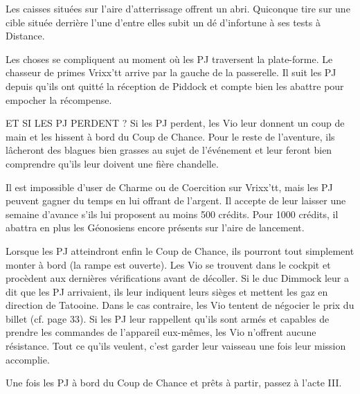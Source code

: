 \documentclass[a4paper,10pt,twoside,twocolumn,openany]{book}
\begin{document}
Les caisses situées sur l’aire d’atterrissage offrent un
abri. Quiconque tire sur une cible située derrière l’une
d’entre elles subit un dé d’infortune \boost à ses tests à
Distance.

Les choses se compliquent au moment où les PJ traversent la plate-forme. Le chasseur de primes Vrixx’tt
arrive par la gauche de la passerelle. Il suit les PJ depuis
qu’ils ont quitté la réception de Piddock et compte bien
les abattre pour empocher la récompense.

\begin{commentbox}{ET SI LES PJ PERDENT ?}
  Si les PJ perdent, les Vio leur donnent un coup de
main et les hissent à bord du Coup de Chance. Pour
le reste de l’aventure, ils lâcheront des blagues bien
grasses au sujet de l’événement et leur feront bien
comprendre qu’ils leur doivent une fière chandelle.
\end{commentbox}

Il est impossible d’user de Charme ou de Coercition
sur Vrixx’tt, mais les PJ peuvent gagner du temps en lui
offrant de l’argent. Il accepte de leur laisser une semaine
d’avance s’ils lui proposent au moins 500 crédits. Pour
1000 crédits, il abattra en plus les Géonosiens encore
présents sur l’aire de lancement.

Lorsque les PJ atteindront enfin le Coup de Chance,
ils pourront tout simplement monter à bord (la rampe
est ouverte). Les Vio se trouvent dans le cockpit et procèdent aux dernières vérifications avant de décoller. Si
le duc Dimmock leur a dit que les PJ arrivaient, ils leur
indiquent leurs sièges et mettent les gaz en direction de
Tatooine. Dans le cas contraire, les Vio tentent de négocier le prix du billet (cf. page 33). Si les PJ leur rappellent
qu’ils sont armés et capables de prendre les commandes
de l’appareil eux-mêmes, les Vio n’offrent aucune résistance. Tout ce qu’ils veulent, c’est garder leur vaisseau
une fois leur mission accomplie.

Une fois les PJ à bord du Coup de Chance et prêts à
partir, passez à l’acte III.
\end{document}
